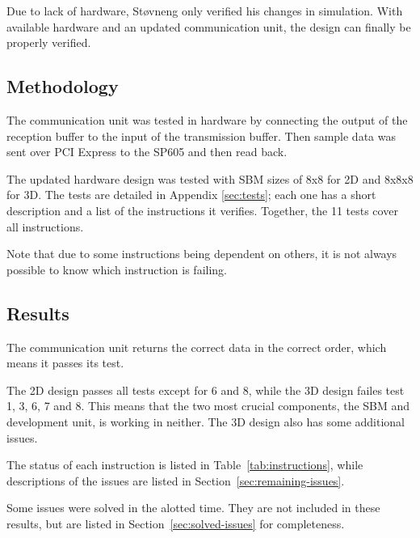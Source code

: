 Due to lack of hardware, Støvneng only verified his changes in simulation.
With available hardware and an updated communication unit, the design can finally be properly verified.

\subsection{Methodology}

The communication unit was tested in hardware by connecting the output of the reception buffer to the input of the transmission buffer.
Then sample data was sent over PCI Express to the SP605 and then read back.

The updated hardware design was tested with SBM sizes of 8x8 for 2D and 8x8x8 for 3D.
The tests are detailed in Appendix \ref{sec:tests}; each one has a short description and a list of the instructions it verifies.
Together, the 11 tests cover all instructions.

Note that due to some instructions being dependent on others, it is not always possible to know which instruction is failing.

\subsection{Results}

The communication unit returns the correct data in the correct order, which means it passes its test.

The 2D design passes all tests except for 6 and 8, while the 3D design failes test 1, 3, 6, 7 and 8.
This means that the two most crucial components, the SBM and development unit, is working in neither.
The 3D design also has some additional issues.

The status of each instruction is listed in Table~\ref{tab:instructions}, while descriptions of the issues are listed in Section~\ref{sec:remaining-issues}.

Some issues were solved in the alotted time.
They are not included in these results, but are listed in Section~\ref{sec:solved-issues} for completeness.

